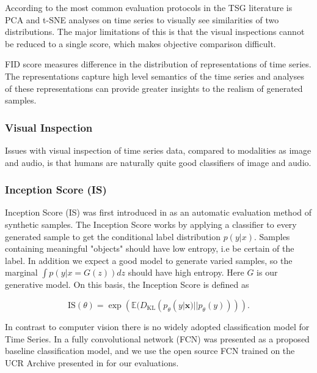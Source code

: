 \documentclass[../../thesis.tex]{subfiles}
\begin{document}
According to \cite{TimeVQVAE} the most common evaluation protocols in the TSG literature is PCA and t-SNE analyses on time series to visually see similarities of two distributions. The major limitations of this is that the visual inspections cannot be reduced to a single score, which makes objective comparison difficult. \newline


FID score measures difference in the distribution of representations of time series. The representations capture high level semantics of the time series and analyses of these representations can provide greater insights to the realism of generated samples. \newline





\subsubsection{Visual Inspection}

Issues with visual inspection of time series data, compared to modalities as image and audio, is that humans are naturally quite good classifiers of image and audio.


\subsubsection{Inception Score (IS)}
Inception Score (IS) was first introduced in \cite{salimans2016improved} as an automatic evaluation method of synthetic samples.\newline
The Inception Score works by applying a classifier to every generated sample to get the conditional label distribution $p(y|x)$. Samples containing meaningful "objects" should have low entropy, i.e be certain of the label. In addition we expect a good model to generate varied samples, so the marginal $\int p(y|x = G(z))dz$ should have high entropy. Here $G$ is our generative model. On this basis, the Inception Score is defined as 

\begin{equation}
    \label{IS}
    {\text{IS}}(\theta) = \exp\left( \mathbb{E}(D_{\text{KL}}(p_\theta(y|\mathbf{x}) || p_\theta(y))) \right).
\end{equation}

In contrast to computer vision there is no widely adopted classification model for Time Series. In \cite{wang2016time} a fully convolutional network (FCN) was presented as a proposed baseline classification model, and we use the open source FCN trained on the UCR Archive presented in \cite{TimeVQVAE} for our evaluations. \newline
\end{document}
